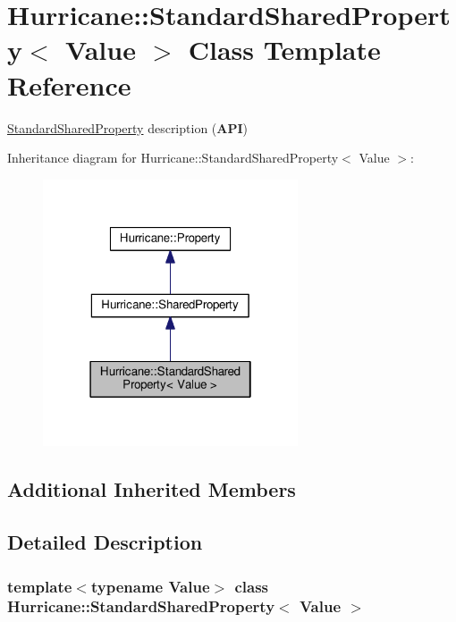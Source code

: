\hypertarget{classHurricane_1_1StandardSharedProperty}{}\section{Hurricane\+:\+:Standard\+Shared\+Property$<$ Value $>$ Class Template Reference}
\label{classHurricane_1_1StandardSharedProperty}


\hyperlink{classHurricane_1_1StandardSharedProperty}{Standard\+Shared\+Property} description ({\bfseries A\+PI})  




Inheritance diagram for Hurricane\+:\+:Standard\+Shared\+Property$<$ Value $>$\+:\nopagebreak
\begin{figure}[H]
\begin{center}
\leavevmode
\includegraphics[width=214pt]{classHurricane_1_1StandardSharedProperty__inherit__graph}
\end{center}
\end{figure}
\subsection*{Additional Inherited Members}


\subsection{Detailed Description}
\subsubsection*{template$<$typename Value$>$\newline
class Hurricane\+::\+Standard\+Shared\+Property$<$ Value $>$}

